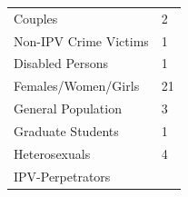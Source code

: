 \documentclass[]{tufte-handout}
\begin{document}
\begin{longtable}[]{@{}ll@{}}
\begin{minipage}[t]{0.59\columnwidth}
Couples\strut
\end{minipage} & \begin{minipage}[t]{0.21\columnwidth}\raggedright\strut
2\strut
\end{minipage}\tabularnewline
\begin{minipage}[t]{0.59\columnwidth}\raggedright\strut
Non-IPV Crime Victims\strut
\end{minipage} & \begin{minipage}[t]{0.21\columnwidth}\raggedright\strut
1\strut
\end{minipage}\tabularnewline
\begin{minipage}[t]{0.59\columnwidth}\raggedright\strut
Disabled Persons\strut
\end{minipage} & \begin{minipage}[t]{0.21\columnwidth}\raggedright\strut
1\strut
\end{minipage}\tabularnewline
\begin{minipage}[t]{0.59\columnwidth}\raggedright\strut
Females/Women/Girls\strut
\end{minipage} & \begin{minipage}[t]{0.21\columnwidth}\raggedright\strut
21\strut
\end{minipage}\tabularnewline
\begin{minipage}[t]{0.59\columnwidth}\raggedright\strut
General Population\strut
\end{minipage} & \begin{minipage}[t]{0.21\columnwidth}\raggedright\strut
3\strut
\end{minipage}\tabularnewline
\begin{minipage}[t]{0.59\columnwidth}\raggedright\strut
Graduate Students\strut
\end{minipage} & \begin{minipage}[t]{0.21\columnwidth}\raggedright\strut
1\strut
\end{minipage}\tabularnewline
\begin{minipage}[t]{0.59\columnwidth}\raggedright\strut
Heterosexuals\strut
\end{minipage} & \begin{minipage}[t]{0.21\columnwidth}\raggedright\strut
4\strut
\end{minipage}\tabularnewline
\begin{minipage}[t]{0.59\columnwidth}\raggedright\strut
IPV-Perpetrators\strut
\end{minipage} & \begin{minipage}[t]{0.21\columnwidth}\raggedright\strut

\end{minipage}
\end{longtable}
\end{document}
